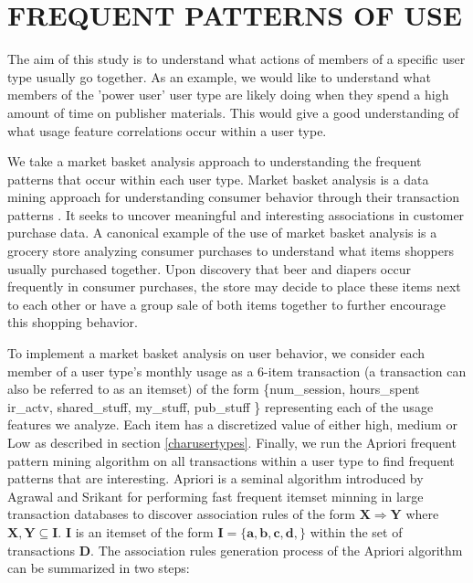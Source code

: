 \documentclass{acm_proc_article-sp}
\begin{document}
\section{FREQUENT PATTERNS OF USE}
The aim of this study is to understand what actions of members of a specific user type usually go together. As an example, we would like to understand what members of the 'power user' user type are likely doing when they spend a high amount of time on publisher materials. This would give a good understanding of what usage feature correlations occur within a user type.

We take a market basket analysis approach to understanding the frequent patterns that occur within each user type. Market basket analysis is a data mining approach for understanding consumer behavior through their transaction patterns \cite{han2006data}. It seeks to uncover meaningful and interesting associations in customer purchase data. A canonical example of the use of  market basket analysis is a grocery store analyzing consumer purchases to understand what items shoppers usually purchased together. Upon discovery that beer and diapers occur frequently in consumer purchases, the store may decide to place these items next to each other or have a group sale of both items together to further encourage this shopping behavior.

To implement a market basket analysis on user behavior, we consider each member of a user type's monthly usage as a 6-item transaction (a transaction can also be referred to as an itemset) of the form \{num\_session, hours\_spent ir\_actv, shared\_stuff, my\_stuff, pub\_stuff \} representing each of the usage features we analyze. Each item has a discretized value of either high, medium or Low as described in section \ref{charusertypes}. Finally, we run the Apriori frequent pattern mining algorithm on all transactions within a user type to find frequent patterns that are interesting. Apriori is a seminal algorithm introduced by Agrawal and Srikant \cite{agrawal} for performing fast frequent itemset minning in large transaction databases to discover association rules of the form $\mathbf{{X} \Longrightarrow {Y}}$ where $\mathbf{X, Y \subseteq I}$. $\mathbf{I}$ is an itemset of the form $\mathbf{I = \{a,b,c,d,\}}$ within the set of transactions $\mathbf{D}$.
The association rules generation process of the Apriori algorithm can be summarized in two steps:
\end{document}
